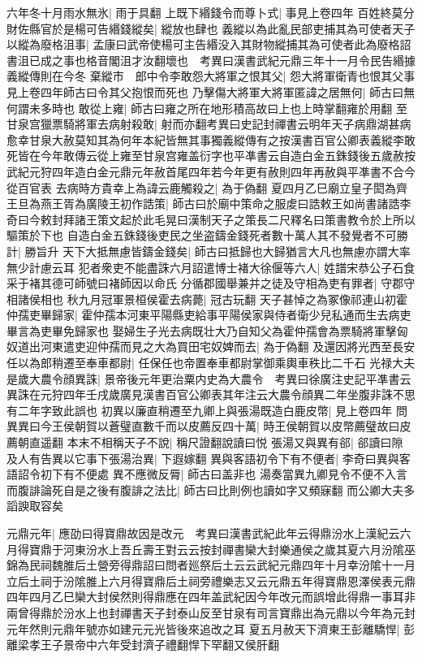 六年冬十月雨水無氷|{
	雨于具翻}
上既下緡錢令而尊卜式|{
	事見上卷四年}
百姓終莫分財佐縣官於是楊可告緡錢縱矣|{
	縱放也肆也}
義縱以為此亂民部吏捕其為可使者天子以縱為廢格沮事|{
	孟康曰武帝使楊可主告緡没入其財物縱捕其為可使者此為廢格詔書沮已成之事也格音閣沮才汝翻壞也　考異曰漢書武紀元鼎三年十一月令民告緡據義縱傳則在今冬}
棄縱市　郎中令李敢怨大將軍之恨其父|{
	怨大將軍衛青也恨其父事見上卷四年師古曰令其父抱恨而死也}
乃擊傷大將軍大將軍匿諱之居無何|{
	師古曰無何謂未多時也}
敢從上雍|{
	師古曰雍之所在地形積高故曰上也上時掌翻雍於用翻}
至甘泉宫獵票騎將軍去病射殺敢|{
	射而亦翻考異曰史記封禪書云明年天子病鼎湖甚病愈幸甘泉大赦莫知其為何年本紀皆無其事獨義縱傳有之按漢書百官公卿表義縱李敢死皆在今年敢傳云從上雍至甘泉宫雍盖衍字也平凖書云自造白金五銖錢後五歲赦按武紀元狩四年造白金元鼎元年赦首尾四年若今年更有赦則四年再赦與平凖書不合今從百官表}
去病時方貴幸上為諱云鹿觸殺之|{
	為于偽翻}
夏四月乙巳廟立皇子閎為齊王旦為燕王胥為廣陵王初作誥策|{
	師古曰於廟中策命之服䖍曰誥敕王如尚書諸誥李奇曰今敕封拜諸王策文起於此毛晃曰漢制天子之策長二尺釋名曰策書教令於上所以驅策於下也}
自造白金五銖錢後吏民之坐盗鑄金錢死者數十萬人其不發覺者不可勝計|{
	勝旨升}
天下大抵無慮皆鑄金錢矣|{
	師古曰抵歸也大歸猶言大凡也無慮亦謂大率無少計慮云耳}
犯者衆吏不能盡誅六月詔遣博士褚大徐偃等六人|{
	姓譜宋恭公子石食采于褚其德可師號曰褚師因以命氏}
分循郡國舉兼并之徒及守相為吏有罪者|{
	守郡守相諸侯相也}
秋九月冠軍景桓侯霍去病薨|{
	冠古玩翻}
天子甚悼之為冢像祁連山初霍仲孺吏畢歸家|{
	霍仲孺本河東平陽縣吏給事平陽侯家與侍者衛少兒私通而生去病吏畢言為吏畢免歸家也}
娶婦生子光去病既壮大乃自知父為霍仲孺會為票騎將軍擊匈奴道出河東遣吏迎仲孺而見之大為買田宅奴婢而去|{
	為于偽翻}
及還因將光西至長安任以為郎稍遷至奉車都尉|{
	任保任也帝置奉車都尉掌御乘輿車秩比二千石}
光禄大夫　是歲大農令顔異誅|{
	景帝後元年更治粟内史為大農令　考異曰徐廣注史記平凖書云異誅在元狩四年壬戌歲廣見漢書百官公卿表其年注云大農令顔異二年坐腹非誅不思有二年字致此誤也}
初異以廉直稍遷至九卿上與張湯既造白鹿皮幣|{
	見上卷四年}
問異異曰今王侯朝賀以蒼璧直數千而以皮薦反四十萬|{
	時王侯朝賀以皮幣薦璧故曰皮薦朝直遥翻}
本末不相稱天子不說|{
	稱尺證翻說讀曰悦}
張湯又與異有郤|{
	郤讀曰隙}
及人有告異以它事下張湯治異|{
	下遐嫁翻}
異與客語初令下有不便者|{
	李奇曰異與客語詔令初下有不便處}
異不應微反脣|{
	師古曰盖非也}
湯奏當異九卿見令不便不入言而腹誹論死自是之後有腹誹之法比|{
	師古曰比則例也讀如字又頻寐翻}
而公卿大夫多謟諛取容矣

元鼎元年|{
	應劭曰得寶鼎故因是改元　考異曰漢書武紀此年云得鼎汾水上漢紀云六月得寶鼎于河東汾水上吾丘壽王對云云按封禪書欒大封樂通侯之歲其夏六月汾隂巫錦為民祠魏脽后土營旁得鼎詔曰問者廵祭后土云云武紀元鼎四年十月幸汾隂十一月立后土祠于汾隂脽上六月得寶鼎后土祠旁禮樂志又云元鼎五年得寶鼎恩澤侯表元鼎四年四月乙巳欒大封侯然則得鼎應在四年盖武紀因今年改元而誤增此得鼎一事耳非兩曾得鼎於汾水上也封禪書天子封泰山反至甘泉有司言寶鼎出為元鼎以今年為元封元年然則元鼎年號亦如建元元光皆後來追改之耳}
夏五月赦天下濟東王彭離驕悍|{
	彭離梁孝王子景帝中六年受封濟子禮翻悍下罕翻又侯肝翻}


